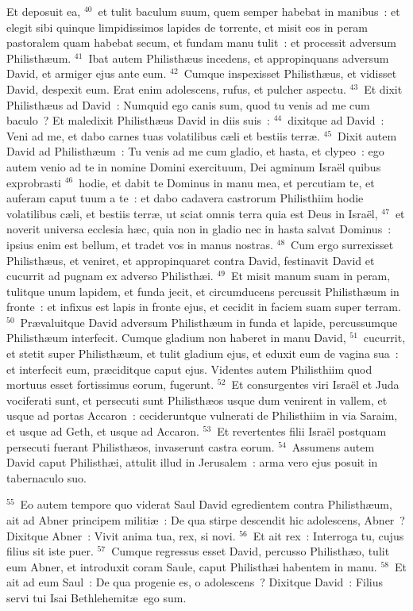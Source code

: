  Et deposuit ea,
${}^{40}$~et tulit baculum suum, quem semper habebat in manibus~: et elegit sibi quinque limpidissimos lapides de torrente, et misit eos in peram pastoralem quam habebat secum, et fundam manu tulit~: et processit adversum Philisth\ae um.
${}^{41}$~Ibat autem Philisth\ae us incedens, et appropinquans adversum David, et armiger ejus ante eum.
${}^{42}$~Cumque inspexisset Philisth\ae us, et vidisset David, despexit eum. Erat enim adolescens, rufus, et pulcher aspectu.
${}^{43}$~Et dixit Philisth\ae us ad David~: Numquid ego canis sum, quod tu venis ad me cum baculo~? Et maledixit Philisth\ae us David in diis suis~:
${}^{44}$~dixitque ad David~: Veni ad me, et dabo carnes tuas volatilibus c\ae li et bestiis terr\ae .
${}^{45}$~Dixit autem David ad Philisth\ae um~: Tu venis ad me cum gladio, et hasta, et clypeo~: ego autem venio ad te in nomine Domini exercituum, Dei agminum Isra\"el quibus exprobrasti
${}^{46}$~hodie, et dabit te Dominus in manu mea, et percutiam te, et auferam caput tuum a te~: et dabo cadavera castrorum Philisthiim hodie volatilibus c\ae li, et bestiis terr\ae , ut sciat omnis terra quia est Deus in Isra\"el,
${}^{47}$~et noverit universa ecclesia h\ae c, quia non in gladio nec in hasta salvat Dominus~: ipsius enim est bellum, et tradet vos in manus nostras.
${}^{48}$~Cum ergo surrexisset Philisth\ae us, et veniret, et appropinquaret contra David, festinavit David et cucurrit ad pugnam ex adverso Philisth\ae i.
${}^{49}$~Et misit manum suam in peram, tulitque unum lapidem, et funda jecit, et circumducens percussit Philisth\ae um in fronte~: et infixus est lapis in fronte ejus, et cecidit in faciem suam super terram.
${}^{50}$~Pr\ae valuitque David adversum Philisth\ae um in funda et lapide, percussumque Philisth\ae um interfecit. Cumque gladium non haberet in manu David,
${}^{51}$~cucurrit, et stetit super Philisth\ae um, et tulit gladium ejus, et eduxit eum de vagina sua~: et interfecit eum, pr\ae ciditque caput ejus. Videntes autem Philisthiim quod mortuus esset fortissimus eorum, fugerunt.
${}^{52}$~Et consurgentes viri Isra\"el et Juda vociferati sunt, et persecuti sunt Philisth\ae os usque dum venirent in vallem, et usque ad portas Accaron~: cecideruntque vulnerati de Philisthiim in via Saraim, et usque ad Geth, et usque ad Accaron.
${}^{53}$~Et revertentes filii Isra\"el postquam persecuti fuerant Philisth\ae os, invaserunt castra eorum.
${}^{54}$~Assumens autem David caput Philisth\ae i, attulit illud in Jerusalem~: arma vero ejus posuit in tabernaculo suo.


${}^{55}$~Eo autem tempore quo viderat Saul David egredientem contra Philisth\ae um, ait ad Abner principem militi\ae~: De qua stirpe descendit hic adolescens, Abner~? Dixitque Abner~: Vivit anima tua, rex, si novi.
${}^{56}$~Et ait rex~: Interroga tu, cujus filius sit iste puer.
${}^{57}$~Cumque regressus esset David, percusso Philisth\ae o, tulit eum Abner, et introduxit coram Saule, caput Philisth\ae i habentem in manu.
${}^{58}$~Et ait ad eum Saul~: De qua progenie es, o adolescens~? Dixitque David~: Filius servi tui Isai Bethlehemit\ae\ ego sum.

